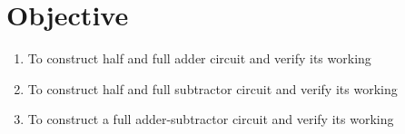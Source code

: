 \section{Objective}

\begin{enumerate}
    \item To construct half and full adder circuit and verify its working
    \item To construct half and full subtractor circuit and verify its working
    \item To construct a full adder-subtractor circuit and verify its working
\end{enumerate}